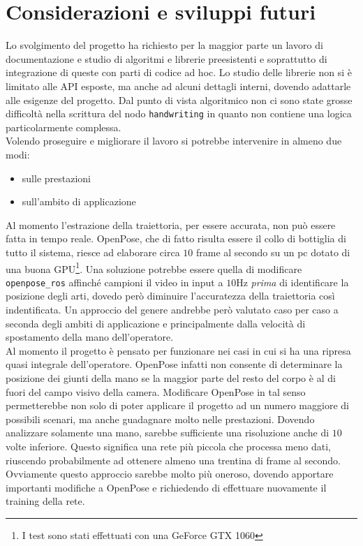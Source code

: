 \documentclass[10pt,twocolumn]{article}
\begin{document}
\section{Considerazioni e sviluppi futuri}
Lo svolgimento del progetto ha richiesto per la maggior parte un lavoro di
documentazione e studio di algoritmi e librerie preesistenti e soprattutto di
integrazione di queste con parti di codice ad hoc. Lo studio delle librerie non
si è limitato alle API esposte, ma anche ad alcuni dettagli interni, dovendo
adattarle alle esigenze del progetto. Dal punto di vista algoritmico non ci sono
state grosse difficoltà nella scrittura del nodo \verb|handwriting| in quanto
non contiene una logica particolarmente complessa. \\
Volendo proseguire e migliorare il lavoro si potrebbe intervenire in almeno due
modi: 
\begin{itemize}
  \item sulle prestazioni
  \item sull'ambito di applicazione
\end{itemize}
Al momento l'estrazione della traiettoria, per essere accurata, non può essere
fatta in tempo reale. OpenPose, che di fatto risulta essere il collo di
bottiglia di tutto il sistema, riesce ad elaborare circa $10$ frame al secondo
su un pc dotato di una buona GPU\footnote{I test sono stati effettuati con una
GeForce GTX 1060}. Una soluzione potrebbe essere quella di modificare
\verb|openpose_ros| affinché campioni il video in input a $10$Hz \textit{prima}
di identificare la posizione degli arti, dovedo però diminuire l'accuratezza
della traiettoria così indentificata. Un approccio del genere andrebbe però
valutato caso per caso a seconda degli ambiti di applicazione e principalmente
dalla velocità di spostamento della mano dell'operatore. \\
Al momento il progetto è pensato per funzionare nei casi in cui si ha una
ripresa quasi integrale dell'operatore. OpenPose infatti non consente di
determinare la posizione dei giunti della mano se la maggior parte del resto del
corpo è al di fuori del campo visivo della camera. Modificare OpenPose in tal
senso permetterebbe non solo di poter applicare il progetto ad un numero
maggiore di possibili scenari, ma anche guadagnare molto nelle prestazioni.
Dovendo analizzare solamente una mano, sarebbe sufficiente una risoluzione anche
di $10$ volte inferiore. Questo significa una rete più piccola che processa meno
dati, riuscendo probabilmente ad ottenere almeno una trentina di frame al
secondo. Ovviamente questo approccio sarebbe molto più oneroso, dovendo
apportare importanti modifiche a OpenPose e richiedendo di effettuare nuovamente
il training della rete.



\printbibliography
\end{document}

